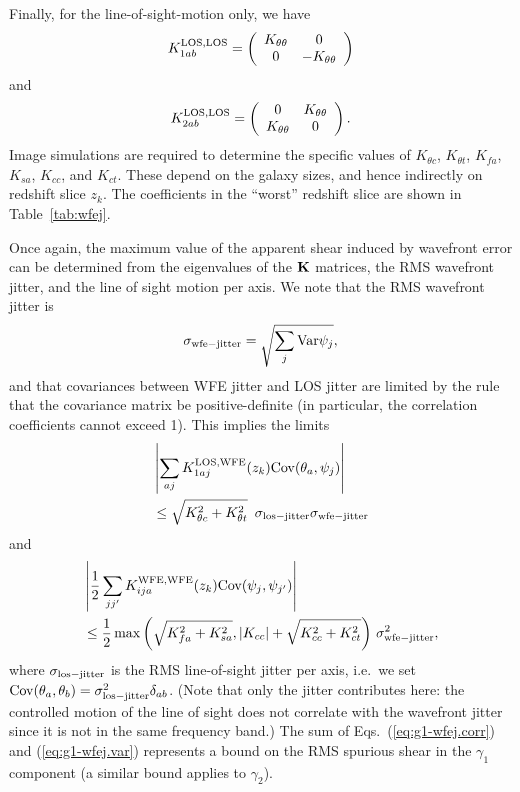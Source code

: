 \documentclass[usenatbib]{mnras}
\begin{document}
Finally, for the line-of-sight-motion only, we have
\begin{equation}
K_{1ab}^{\rm LOS,LOS} = \left( \begin{array}{cc} K_{\theta\theta} & 0 \\ 0 & -K_{\theta\theta} \end{array} \right)
\label{eq:K1t}
\end{equation}
and
\begin{equation}
K_{2ab}^{\rm LOS,LOS} = \left( \begin{array}{cc} 0 & K_{\theta\theta} \\ K_{\theta\theta} & 0 \end{array} \right).
\label{eq:K2t}
\end{equation}
Image simulations are required to determine the specific values of
$K_{\theta c}$, $K_{\theta t}$, $K_{fa}$, $K_{sa}$, $K_{cc}$, and
$K_{ct}$. These depend on the galaxy sizes, and hence indirectly on
redshift slice $z_k$. The coefficients in the ``worst'' redshift slice
are shown in Table~\ref{tab:wfej}.

Once again, the maximum value of the apparent shear induced by
wavefront error can be determined from the eigenvalues of the ${\bf
K}$ matrices, the RMS wavefront jitter, and the line of sight motion
per axis. We note that the RMS wavefront jitter is
\begin{equation}
\sigma_{\rm wfe-jitter} = \sqrt{\sum_j {\rm Var} \psi_j},
\end{equation}
and that covariances between WFE jitter and LOS jitter are limited by the rule that the covariance matrix be positive-definite (in particular, the correlation coefficients cannot exceed 1). This implies the limits
\begin{align}
&\left|\sum_{aj} K^{\rm LOS,WFE}_{1aj}(z_k) {\rm
Cov}({\theta}_a,{\psi}_j)\right| \nonumber\\
&\le \sqrt{K_{\theta c}^2 + K_{\theta
t}^2}~\, \sigma_{\rm los-jitter} \sigma_{\rm wfe-jitter}
\label{eq:g1-wfej.corr}
\end{align}
and
\begin{align}
&\left|\frac12 \sum_{jj'} K^{\rm WFE,WFE}_{ija}(z_k) {\rm
Cov}({\psi}_j,{\psi}_{j'})\right| \nonumber\\
&\le \frac12 \max\left(
\sqrt{K_{fa}^2+K_{sa}^2}, |K_{cc}|+\sqrt{K_{cc}^2+K_{ct}^2}
\right)\,\sigma_{\rm wfe-jitter}^2,
\label{eq:g1-wfej.var}
\end{align}
where $\sigma_{\rm los-jitter}$ is the RMS line-of-sight jitter per
axis, i.e.\ we set ${\rm Cov}(\theta_a,\theta_b) = \sigma_{\rm
los-jitter}^2\delta_{ab}$. (Note that only the jitter contributes
here: the controlled motion of the line of sight does not correlate
with the wavefront jitter since it is not in the same frequency band.)
The sum of Eqs.~(\ref{eq:g1-wfej.corr}) and (\ref{eq:g1-wfej.var})
represents a bound on the RMS spurious shear in the $\gamma_1$
component (a similar bound applies to $\gamma_2$).
\end{document}

